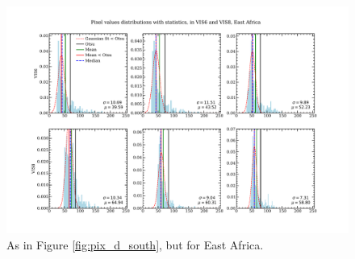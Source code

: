 \begin{figure}
  \centering
  \includegraphics[width=\textwidth]{figures/pixel_distributions_stats_eastafrica}
  \caption{As in Figure \ref{fig:pix_d_south}, but for East Africa.}
  \label{fig:pix_d_east}
\end{figure}

